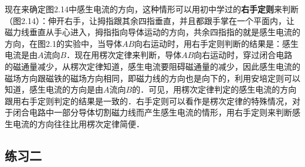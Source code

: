 现在来确定图2.14中感生电流的方向，这种情形可以用初中学过的\textbf{右手定则}来判断（图2.14）：伸开右手，让拇指跟其余四指垂直，并且都跟手掌在一个平面内，让磁力线垂直从手心进入，拇指指向导体运动的方向，共余四指指的就是感生电流的方向，在图2.1的实验中，当导体$AB$向右运动时，用右手定则判断的结果是：感生电流是由$A$流向$B$．现在用楞次定律来判断，导体$AB$向右运动时，穿过闭合电路的磁通量减少，从楞次定律知道，感生电流要阻碍磁通量的减少，因此感生电流的磁场方向跟磁铁的磁场方向相同，即磁力线的方向也是向下的，利用安培定则可以知道，感生电流的方向是由$A$流向$B$的．可见，用楞次定律判定的感生电流的方向跟用右手定则判定的结果是一致的．右手定则可以看作是楞次定律的特殊情况，对于闭合电路中一部分导体切割磁力线而产生感生电流的情形，用右手定则来判断感生电流的方向往往比用楞次定律简便．

\subsection*{练习二}

